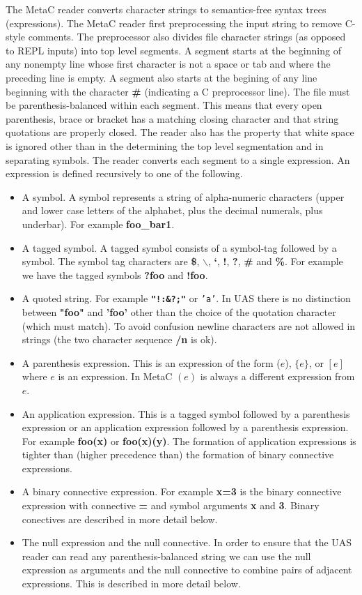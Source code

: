 \documentclass{article}
\begin{document}
The MetaC reader converts character strings to semantics-free syntax trees (expressions).
The MetaC reader first preprocessing the input string to remove C-style comments.
The preprocessor also divides file character strings (as opposed to REPL inputs) into top level segments.
A segment starts at the beginning of any nonempty line whose first character is not a space or tab and where the preceding line is empty.
A segment also starts at the begining of any line beginning with the character {\bf \#} (indicating a C preprocessor line).
The file must be parenthesis-balanced within each segment.  This means that every open parenthesis, brace or bracket has a matching closing character and that string quotations
are properly closed.  The reader also has the property that white space is ignored other than in the determining the top level segmentation and in separating symbols.
The reader converts each segment to a single expression.
An expression is defined recursively to one of the following.

\begin{itemize}
\item A symbol.  A symbol represents a string of alpha-numeric characters (upper and lower case letters of the alphabet, plus the decimal numerals, plus underbar).
  For example {\bf  foo\_bar1}.
\item A tagged symbol.  A tagged symbol consists of a symbol-tag followed by a symbol.  The symbol tag characters are {\bf \$}, {\bf $\backslash$}, {\bf `}, {\bf !}, {\bf ?}, {\bf \#} and {\bf \%}.
  For example we have the tagged symbols {\bf ?foo} and {\bf !foo}.
\item A quoted string.  For example {\bf \tt "!:\&?;"} or {\tt 'a'}.  In UAS there is no distinction between {\bf "foo"} and {\bf 'foo'} other than the choice of the quotation character (which must match).
  To avoid confusion newline characters are not allowed in strings (the two character sequence {\bf /n} is ok).
\item A parenthesis expression.  This is an expression of the form ($e$), $\{e\}$, or $[e]$ where $e$ is an expression.  In MetaC $(e)$ is always a different expression from $e$.
\item An application expression.  This is a tagged symbol followed by a parenthesis expression or an application expression followed by a parenthesis expression.  For example {\bf foo(x)} or {\bf foo(x)(y)}.
The formation of application expressions is tighter than (higher precedence than) the formation of binary connective expressions.
\item A binary connective expression.  For example {\bf x=3} is the binary connective expression with connective {\bf =} and symbol arguments {\bf x} and {\bf 3}.  Binary conectives are described in more detail below.
\item The null expression and the null connective. In order to ensure that the UAS reader can read any parenthesis-balanced string we can use the null
  expression as arguments and the null connective to combine pairs of adjacent expressions.  This is described in more detail below.
\end{itemize}
\end{document}
